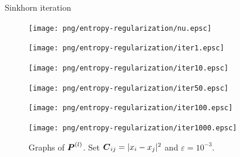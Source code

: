 \begin{frame}{Sinkhorn iteration}
    \vspace{-1em}
    \begin{figure}
        \captionsetup{font=scriptsize}
        \begin{minipage}[t]{0.05\linewidth}
            \vspace{0pt}
            \centering
            \texttt{[image: png/entropy-regularization/nu.epsc]}
        \end{minipage}
        \hfill
        \begin{minipage}[t]{0.18\linewidth}
            \vspace{0pt}
            \centering
            \texttt{[image: png/entropy-regularization/iter1.epsc]}
            \caption*{$l = 1$}
        \end{minipage}
        \hfill
        \begin{minipage}[t]{0.18\linewidth}
            \vspace{0pt}
            \centering
            \texttt{[image: png/entropy-regularization/iter10.epsc]}
            \caption*{$l = 10$}
        \end{minipage}
        \hfill
        \begin{minipage}[t]{0.18\linewidth}
            \vspace{0pt}
            \centering
            \texttt{[image: png/entropy-regularization/iter50.epsc]}
            \caption*{$l = 50$}
        \end{minipage}
        \hfill
        \begin{minipage}[t]{0.18\linewidth}
            \vspace{0pt}
            \centering
            \texttt{[image: png/entropy-regularization/iter100.epsc]}
            \caption*{$l = 100$}
        \end{minipage}
        \hfill
        \begin{minipage}[t]{0.18\linewidth}
            \vspace{0pt}
            \centering
            \texttt{[image: png/entropy-regularization/iter1000.epsc]}
            \caption*{$l = 1000$}
        \end{minipage}
        \hfill
        \vspace{-1.2em}
        \caption{Graphs of $\boldsymbol P^{(l)}$. Set $\boldsymbol C_{ij} = |x_i-x_j|^2$ and $\varepsilon=10^{-3}$.}
    \end{figure}
\end{frame}